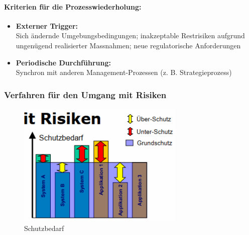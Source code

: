 \documentclass[10pt,a4paper]{article}
\begin{document}
\paragraph*{Kriterien für die Prozesswiederholung:}
\begin{itemize}[noitemsep,topsep=0pt,leftmargin=*]
    \item \textbf{Externer Trigger:}\\Sich ändernde
    Umgebungsbedingungen; inakzeptable Restrisiken
    aufgrund ungenügend realisierter Massnahmen; neue
    regulatorische Anforderungen
    \item \textbf{Periodische Durchführung:}\\Synchron mit anderen
    Management-Prozessen (z. B. Strategieprozess)
\end{itemize}

\subsubsection*{Verfahren für den Umgang mit Risiken}
\begin{figure}[H]
    \begin{center}
    \includegraphics[width=8cm]{images/Schutzbedarf.png}
    \caption{Schutzbedarf}
    \label{Schutzbedarf}
    \end{center}
\end{figure}
\end{document}
